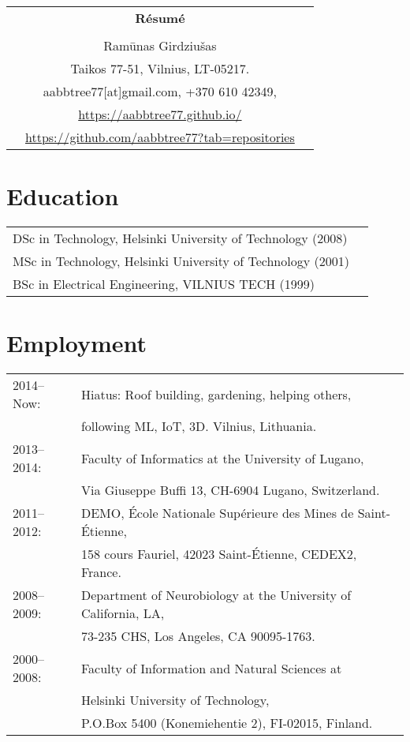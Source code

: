 \documentclass[a4paper,11pt]{article}
\begin{document}
\thispagestyle{empty}

%
%
\begin{center}
\begin{tabular}{ccc}
&\Large \textbf{R\'{e}sum\'{e}}&\\
\\
& Ram\={u}nas Girdziu\v{s}as &\\  
& Taikos 77-51, Vilnius, LT-05217. &\\
& aabbtree77[at]gmail.com, +370 610 42349, &\\
& \url{https://aabbtree77.github.io/}\\
& \url{https://github.com/aabbtree77?tab=repositories}
\end{tabular}
\end{center}
%
\section*{Education}
%
\begin{tabular}{ll}
        DSc in Technology, Helsinki University of Technology (2008)\\
        MSc in Technology, Helsinki University of Technology (2001)\\
        BSc in Electrical Engineering, VILNIUS TECH (1999)
\end{tabular}
%
\section*{Employment}
%
\begin{tabular}{ll}
2014--Now: & Hiatus: Roof building, gardening, helping others,\\
                 & following ML, IoT, 3D. Vilnius, Lithuania.\\
2013--2014: & Faculty of Informatics at the University of Lugano,\\
                        & Via Giuseppe Buffi 13, CH-6904 Lugano, Switzerland. 
\\
2011--2012: & DEMO, \'{E}cole Nationale Sup\'{e}rieure des Mines de Saint-\'{E}tienne,\\
&158 cours Fauriel, 42023 Saint-\'Etienne, CEDEX2, France.
\\
2008--2009: & Department of Neurobiology at the University of California, LA,\\
&73-235 CHS, Los Angeles, CA 90095-1763.
\\
2000--2008: & Faculty of Information and Natural Sciences at\\
            & Helsinki University of Technology,\\ 
&  P.O.Box 5400 (Konemiehentie 2), FI-02015, Finland.
\end{tabular}
\end{document}
